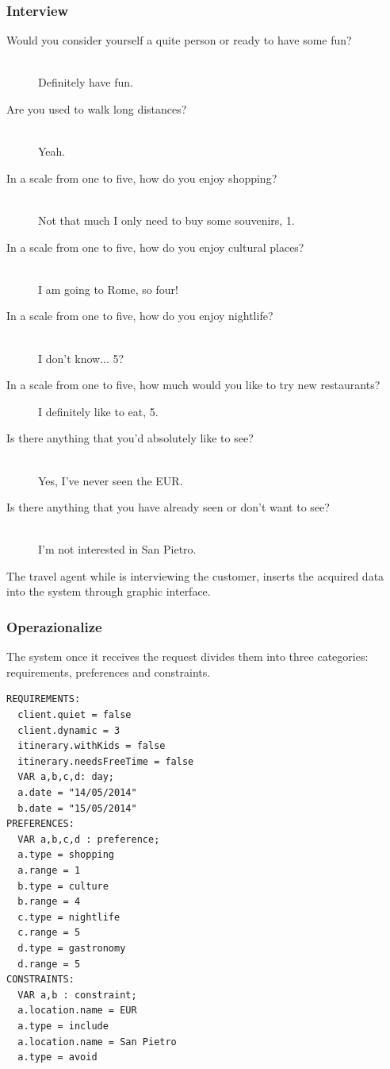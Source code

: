 \documentclass[11pt]{article} %
\begin{document}
\subsubsection{Interview} 

\begin{description}
  \item[Would you consider yourself a quite person or ready to have some fun?] \hfill \\
  Definitely have fun.
  \item[Are you used to walk long distances?] \hfill \\
  Yeah.
  \item[In a scale from one to five, how do you enjoy shopping?] \hfill \\
  Not that much I only need to buy some souvenirs, 1.
  \item[In a scale from one to five, how do you enjoy cultural places?] \hfill \\
  I am going to Rome, so four!
  \item[In a scale from one to five, how do you enjoy nightlife?] \hfill \\
  I don't know... 5?
  \item[In a scale from one to five, how much would you like to try new restaurants?] \hfill 
  I definitely like to eat, 5.
  \item[Is there anything that you'd absolutely like to see?] \hfill \\
  Yes, I've never seen the EUR.
  \item[Is there anything that you have already seen or don't want to see?] \hfill \\
  I'm not interested in San Pietro.
\end{description}

The travel agent while is interviewing the customer, inserts the acquired data into the system through graphic interface.

\subsubsection{Operazionalize}
The system once it receives the request divides them into three categories: requirements, preferences and constraints.

\begin{lstlisting}[label=Rules,caption=Domain instance of the data inserted into the system,breaklines=true,mathescape=true]
REQUIREMENTS:
  client.quiet = false
  client.dynamic = 3
  itinerary.withKids = false
  itinerary.needsFreeTime = false
  VAR a,b,c,d: day;
  a.date = "14/05/2014"
  b.date = "15/05/2014"
PREFERENCES:
  VAR a,b,c,d : preference;
  a.type = shopping
  a.range = 1
  b.type = culture
  b.range = 4
  c.type = nightlife
  c.range = 5
  d.type = gastronomy
  d.range = 5
CONSTRAINTS:
  VAR a,b : constraint;
  a.location.name = EUR
  a.type = include
  a.location.name = San Pietro
  a.type = avoid
\end{lstlisting}
\end{document}

